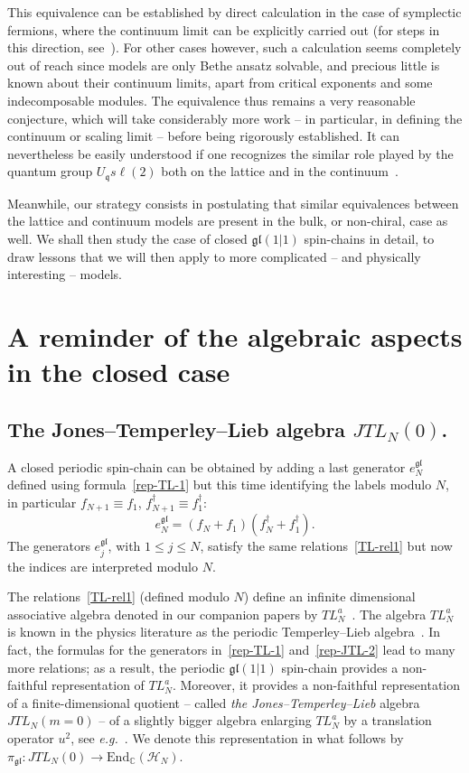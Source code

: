 \documentclass[11pt]{article}
\newcommand{\q}{\mathfrak{q}}
\newcommand{\PTL}[1]{TL^a_{#1}}
\newcommand{\JTL}[1]{JTL_{#1}}
\newcommand{\LQG}{U_{\q} s\ell(2)}
\newcommand{\Hilb}{\mathcal{H}}
\newcommand{\oC}{\mathbb{C}}
\newcommand{\Endo}{\mathrm{End}}
\newcommand{\gl}{\mathfrak{gl}}
\newcommand{\chVv}{\Hilb_{N}}
\newcommand{\repgl}{\pi_{\gl}}
\theoremstyle{definition}
\begin{document}
This equivalence can be established by direct calculation
in the case of symplectic fermions, where the continuum limit can be
explicitly carried out (for steps in this direction, see~\cite{GRS1}).
For other cases however, such a calculation seems
completely out of reach since models are only Bethe ansatz solvable,
and precious little is known about their continuum limits, apart from
critical exponents and some indecomposable modules. The equivalence thus
remains a very reasonable conjecture, which will take considerably
more work -- in particular, in defining the continuum or scaling limit --
before being rigorously established. It can nevertheless be easily
understood if one recognizes the similar role played by the quantum
group $\LQG$ both on the lattice and in the continuum~\cite{BFGT,BGT}.

Meanwhile, our strategy consists in postulating that similar
equivalences between the lattice and continuum models are present
in the bulk, or non-chiral, case as well. We shall then study the case
of closed $\gl(1|1)$ spin-chains
in detail, to draw lessons that we will then apply to more
complicated -- and physically interesting -- models.

\section{A reminder of the algebraic aspects in the closed case}\label{sec:remindclosed}


\subsection{The Jones--Temperley--Lieb algebra $\JTL{N}(0)$.}
\label{subsec:TL-alg-def}

A closed periodic spin-chain can be obtained by adding a last generator
$e_{N}^{\gl}$ defined using formula~\eqref{rep-TL-1} but this time
identifying the labels modulo $N$, in particular $f_{N+1}\equiv
f_1$, $f^\dagger_{N+1}\equiv f_1^\dagger$:
\begin{equation}\label{rep-JTL-2}
e_{N}^{\gl}=(f_{N}+f_{1})(f_{N}^\dagger+f_{1}^\dagger).
\end{equation}
The generators $e_j^{\gl}$, with $1\leq j\leq N$, satisfy the
same relations~\eqref{TL-rel1} but now the indices are interpreted
modulo $N$.



The relations~\eqref{TL-rel1} (defined modulo $N$) define an infinite
dimensional associative algebra denoted in our companion papers by
$\PTL{N}$~\cite{GL,GL1}. The algebra $\PTL{N}$ is known in the physics
literature as the periodic Temperley--Lieb
algebra~\cite{MartinSaleur,MartinSaleur1}. In fact, the formulas for
the generators in~\eqref{rep-TL-1} and~\eqref{rep-JTL-2} lead to many more relations; as a
result, the periodic $\gl(1|1)$ spin-chain provides  a non-faithful
representation of
$\PTL{N}$. Moreover, it  provides  a non-faithful
representation of a finite-dimensional quotient --  called \textit{the Jones--Temperley--Lieb}
algebra  $\JTL{N}(m=0)$ -- of a slightly bigger algebra
  enlarging $\PTL{N}$ by a translation operator $u^2$, see \textit{e.g.}~\cite[Sec.~2.1]{GRS2}. We denote this representation in what follows by
$\repgl:\JTL{N}(0)\to\Endo_{\oC}(\chVv)$.
\end{document}
